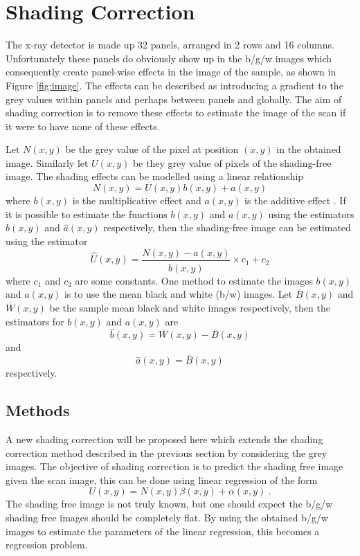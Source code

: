 \documentclass[a4paper]{proc}
\begin{document}
\section{Shading Correction}
The x-ray detector is made up 32 panels, arranged in 2 rows and 16 columns. Unfortunately these panels do obviously show up in the b/g/w images which consequently create panel-wise effects in the image of the sample, as shown in Figure \ref{fig:image}. The effects can be described as introducing a gradient to the grey values within panels and perhaps between panels and globally. The aim of shading correction is to remove these effects to estimate the image of the scan if it were to have none of these effects.

Let $N(x,y)$ be the grey value of the pixel at position $(x,y)$ in the obtained image. Similarly let $U(x,y)$ be they grey value of pixels of the shading-free image. The shading effects can be modelled using a linear relationship
\begin{equation}
N(x,y) = U(x,y)b(x,y) + a(x,y)
\end{equation} 
where $b(x,y)$ is the multiplicative effect and $a(x,y)$ is the additive effect \cite{young2000shading}. If it is possible to estimate the functions $b(x,y)$ and $a(x,y)$ using the estimators $\widehat{b}(x,y)$ and $\widehat{a}(x,y)$ respectively, then the shading-free image can be estimated using the estimator
\begin{equation}
\widehat{U}(x,y) = \frac{N(x,y)-\widehat{a}(x,y)}{\widehat{b}(x,y)} \times c_1 + c_2
\end{equation}
where $c_1$ and $c_2$ are some constants.
One method to estimate the images $b(x,y)$ and $a(x,y)$ is to use the mean black and white (b/w) images. Let $\overline{B}(x,y)$ and $\overline{W}(x,y)$ be the sample mean black and white images respectively, then the estimators for $b(x,y)$ and $a(x,y)$ are
\begin{equation}
\widehat{b}(x,y) = \overline{W}(x,y) - \overline{B}(x,y)
\end{equation}
and
\begin{equation}
\widehat{a}(x,y) = \overline{B}(x,y)
\end{equation}
respectively.

\subsection{Methods}
A new shading correction will be proposed here which extends the shading correction method described in the previous section by considering the grey images. The objective of shading correction is to predict the shading free image given the scan image, this can be done using linear regression of the form
\begin{equation}
U(x,y) = N(x,y)\beta(x,y)+\alpha(x,y) \ .
\end{equation}
The shading free image is not truly known, but one should expect the b/g/w shading free images should be completely flat. By using the obtained b/g/w images to estimate the parameters of the linear regression, this becomes a regression problem.
\end{document}
